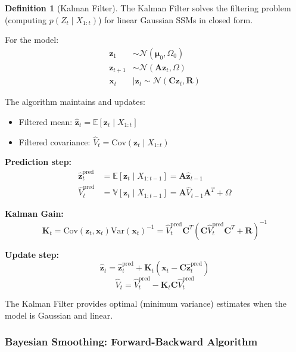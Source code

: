 \documentclass[12pt,a4paper]{article}
\theoremstyle{definition}
\newtheorem{definition}{Definition}[section]
\begin{document}
\begin{definition}[Kalman Filter]
The Kalman Filter solves the filtering problem (computing $p(Z_t \mid X_{1:t})$) for linear Gaussian SSMs in closed form.

For the model:
\begin{align}
\mathbf{z}_1 &\sim \mathcal{N}(\boldsymbol{\mu}_0, \Omega_0)\\
\mathbf{z}_{t+1} &\sim \mathcal{N}(\mathbf{A} \mathbf{z}_t, \Omega)\\
\mathbf{x}_t &\mid \mathbf{z}_t \sim \mathcal{N}(\mathbf{C} \mathbf{z}_t, \mathbf{R})
\end{align}

The algorithm maintains and updates:
\begin{itemize}
    \item Filtered mean: $\hat{\mathbf{z}}_t = \mathbb{E}[\mathbf{z}_t \mid X_{1:t}]$
    \item Filtered covariance: $\hat{V}_t = \text{Cov}(\mathbf{z}_t \mid X_{1:t})$
\end{itemize}

\textbf{Prediction step:} 
\begin{align}
\hat{\mathbf{z}}_t^{\text{pred}} &= \mathbb{E}[\mathbf{z}_t \mid X_{1:t-1}] = \mathbf{A} \hat{\mathbf{z}}_{t-1}\\
\hat{V}_t^{\text{pred}} &= \mathbb{V}[\mathbf{z}_t \mid X_{1:t-1}] = \mathbf{A} \hat{V}_{t-1} \mathbf{A}^T + \Omega
\end{align}

\textbf{Kalman Gain:}
\[
\mathbf{K}_t = \text{Cov}(\mathbf{z}_t, \mathbf{x}_t) \text{Var}(\mathbf{x}_t)^{-1} = \hat{V}_t^{\text{pred}} \mathbf{C}^T (\mathbf{C} \hat{V}_t^{\text{pred}} \mathbf{C}^T + \mathbf{R})^{-1}
\]

\textbf{Update step:}
\[
\hat{\mathbf{z}}_t = \hat{\mathbf{z}}_t^{\text{pred}} + \mathbf{K}_t (\mathbf{x}_t - \mathbf{C} \hat{\mathbf{z}}_t^{\text{pred}})
\]
\[
\hat{V}_t = \hat{V}_t^{\text{pred}} - \mathbf{K}_t \mathbf{C} \hat{V}_t^{\text{pred}}
\]

The Kalman Filter provides optimal (minimum variance) estimates when the model is Gaussian and linear.
\end{definition}

\subsubsection{Bayesian Smoothing: Forward-Backward Algorithm}
\end{document}
